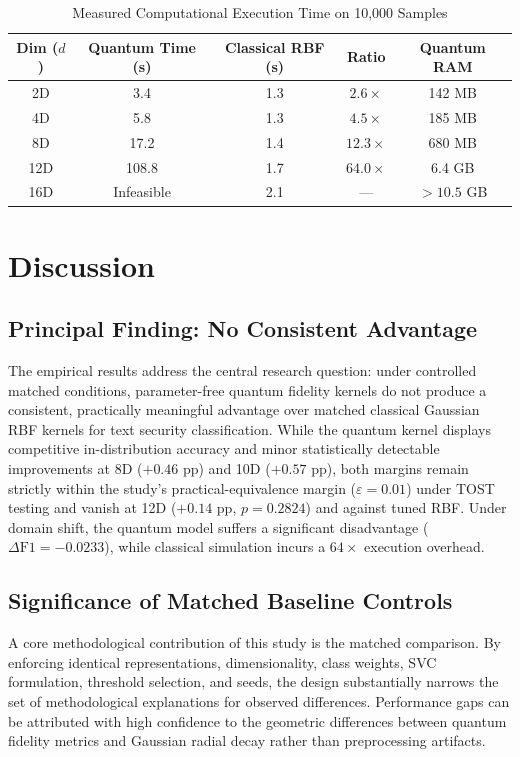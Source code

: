\documentclass[10pt,twocolumn,letterpaper]{article}
\begin{document}
\begin{table}[t]
\centering
\scriptsize
\caption{Measured Computational Execution Time on 10,000 Samples}
\label{tab:runtime}
\setlength{\tabcolsep}{2pt}
\begin{tabular}{ccccc}
\toprule
Dim ($d$) & Quantum Time (s) & Classical RBF (s) & Ratio & Quantum RAM \\
\midrule
2D & 3.4 & 1.3 & $2.6\times$ & 142 MB \\
4D & 5.8 & 1.3 & $4.5\times$ & 185 MB \\
8D & 17.2 & 1.4 & $12.3\times$ & 680 MB \\
12D & 108.8 & 1.7 & $64.0\times$ & 6.4 GB \\
16D & Infeasible & 2.1 & — & $>10.5$ GB \\
\bottomrule
\end{tabular}
\end{table}

\section{Discussion}
\label{sec:discussion}

\subsection{Principal Finding: No Consistent Advantage}
The empirical results address the central research question: under controlled matched conditions, parameter-free quantum fidelity kernels do not produce a consistent, practically meaningful advantage over matched classical Gaussian RBF kernels for text security classification. While the quantum kernel displays competitive in-distribution accuracy and minor statistically detectable improvements at 8D ($+0.46$ pp) and 10D ($+0.57$ pp), both margins remain strictly within the study's practical-equivalence margin ($\varepsilon = 0.01$) under TOST testing and vanish at 12D ($+0.14$ pp, $p = 0.2824$) and against tuned RBF. Under domain shift, the quantum model suffers a significant disadvantage ($\Delta\text{F1} = -0.0233$), while classical simulation incurs a $64\times$ execution overhead.

\subsection{Significance of Matched Baseline Controls}
A core methodological contribution of this study is the matched comparison. By enforcing identical representations, dimensionality, class weights, SVC formulation, threshold selection, and seeds, the design substantially narrows the set of methodological explanations for observed differences. Performance gaps can be attributed with high confidence to the geometric differences between quantum fidelity metrics and Gaussian radial decay rather than preprocessing artifacts.
\end{document}
